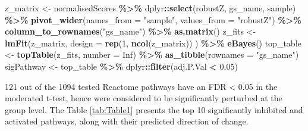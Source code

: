 \documentclass[9pt,a4paper,]{extarticle}
\newenvironment{Shaded}{\begin{snugshade}}{\end{snugshade}}
\newcommand{\AttributeTok}[1]{\textcolor[rgb]{0.13,0.29,0.53}{#1}}
\newcommand{\ConstantTok}[1]{\textcolor[rgb]{0.56,0.35,0.01}{#1}}
\newcommand{\DecValTok}[1]{\textcolor[rgb]{0.00,0.00,0.81}{#1}}
\newcommand{\FloatTok}[1]{\textcolor[rgb]{0.00,0.00,0.81}{#1}}
\newcommand{\FunctionTok}[1]{\textcolor[rgb]{0.13,0.29,0.53}{\textbf{#1}}}
\newcommand{\NormalTok}[1]{#1}
\newcommand{\OtherTok}[1]{\textcolor[rgb]{0.56,0.35,0.01}{#1}}
\newcommand{\SpecialCharTok}[1]{\textcolor[rgb]{0.81,0.36,0.00}{\textbf{#1}}}
\newcommand{\StringTok}[1]{\textcolor[rgb]{0.31,0.60,0.02}{#1}}
\begin{document}
\begin{Shaded}
\begin{Highlighting}[]
\NormalTok{z\_matrix }\OtherTok{\textless{}{-}}\NormalTok{ normalisedScores }\SpecialCharTok{\%\textgreater{}\%}
\NormalTok{    dplyr}\SpecialCharTok{::}\FunctionTok{select}\NormalTok{(robustZ, gs\_name, sample) }\SpecialCharTok{\%\textgreater{}\%}
    \FunctionTok{pivot\_wider}\NormalTok{(}\AttributeTok{names\_from =} \StringTok{"sample"}\NormalTok{, }\AttributeTok{values\_from =} \StringTok{"robustZ"}\NormalTok{) }\SpecialCharTok{\%\textgreater{}\%}
    \FunctionTok{column\_to\_rownames}\NormalTok{(}\StringTok{"gs\_name"}\NormalTok{) }\SpecialCharTok{\%\textgreater{}\%}
    \FunctionTok{as.matrix}\NormalTok{()}
\NormalTok{z\_fits }\OtherTok{\textless{}{-}} \FunctionTok{lmFit}\NormalTok{(z\_matrix, }\AttributeTok{design =} \FunctionTok{rep}\NormalTok{(}\DecValTok{1}\NormalTok{, }\FunctionTok{ncol}\NormalTok{(z\_matrix))}
\NormalTok{                ) }\SpecialCharTok{\%\textgreater{}\%} 
  \FunctionTok{eBayes}\NormalTok{()}
\NormalTok{top\_table }\OtherTok{\textless{}{-}} \FunctionTok{topTable}\NormalTok{(z\_fits, }\AttributeTok{number =} \ConstantTok{Inf}\NormalTok{) }\SpecialCharTok{\%\textgreater{}\%}
  \FunctionTok{as\_tibble}\NormalTok{(}\AttributeTok{rownames =} \StringTok{"gs\_name"}\NormalTok{)}
\NormalTok{sigPathway }\OtherTok{\textless{}{-}}\NormalTok{ top\_table }\SpecialCharTok{\%\textgreater{}\%}
\NormalTok{    dplyr}\SpecialCharTok{::}\FunctionTok{filter}\NormalTok{(adj.P.Val }\SpecialCharTok{\textless{}} \FloatTok{0.05}\NormalTok{)}
\end{Highlighting}
\end{Shaded}

121 out of the 1094 tested Reactome pathways have an FDR \textless{} 0.05 in the moderated t-test, hence were considered to be significantly perturbed at the group level. The Table \ref{tab:Table1} presents the top 10 significantly inhibited and activated pathways, along with their predicted direction of change.
\end{document}
